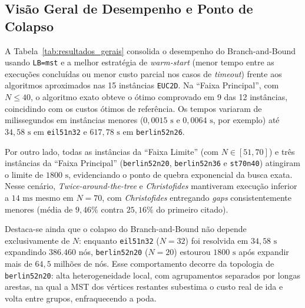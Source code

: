 \documentclass[12pt,a4paper]{article}
\renewcommand{\_}{\origunderscore\hspace{0pt}}
\begin{document}
\subsection{Visão Geral de Desempenho e Ponto de Colapso}
A Tabela~\ref{tab:resultados_gerais} consolida o desempenho do Branch-and-Bound usando \texttt{LB=mst} e a melhor estratégia de \textit{warm-start} (menor tempo entre as execuções concluídas ou menor custo parcial nos casos de \textit{timeout}) frente aos algoritmos aproximados nas 15 instâncias \texttt{EUC\_2D}. Na ``Faixa Principal'', com $N \le 40$, o algoritmo exato obteve o ótimo comprovado em 9 das 12 instâncias, coincidindo com os custos ótimos de referência. Os tempos variaram de milissegundos em instâncias menores ($0{,}0015\text{ s}$ e $0{,}0064\text{ s}$, por exemplo) até $34{,}58\text{ s}$ em \texttt{eil51\_n32} e $617{,}78\text{ s}$ em \texttt{berlin52\_n26}.

Por outro lado, todas as instâncias da ``Faixa Limite'' (com $N \in [51, 70]$) e três instâncias da ``Faixa Principal'' (\texttt{berlin52\_n20}, \texttt{berlin52\_n36} e \texttt{st70\_n40}) atingiram o limite de $1800\text{ s}$, evidenciando o ponto de quebra exponencial da busca exata. Nesse cenário, \textit{Twice-around-the-tree} e \textit{Christofides} mantiveram execução inferior a $14\text{ ms}$ mesmo em $N=70$, com \textit{Christofides} entregando \textit{gaps} consistentemente menores (média de $9{,}46\%$ contra $25{,}16\%$ do primeiro citado). 

Destaca-se ainda que o colapso do Branch-and-Bound não depende exclusivamente de $N$: enquanto \texttt{eil51\_n32} ($N=32$) foi resolvida em $34{,}58\text{ s}$ expandindo $386.460$ nós, \texttt{berlin52\_n20} ($N=20$) estourou $1800\text{ s}$ após expandir mais de $64{,}5$ milhões de nós. Esse comportamento decorre da topologia de \texttt{berlin52\_n20}: alta heterogeneidade local, com agrupamentos separados por longas arestas, na qual a MST dos vértices restantes subestima o custo real de ida e volta entre grupos, enfraquecendo a poda.
\end{document}
